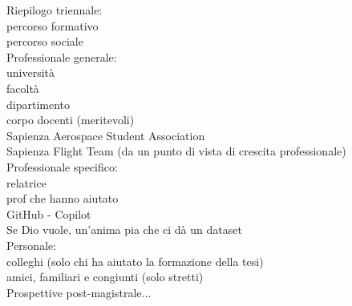 \begin{acknowledgments}
Riepilogo triennale:\\
\indent* percorso formativo\\
\indent* percorso sociale\\
Professionale generale:\\
\indent* università\\
\indent* facoltà\\
\indent* dipartimento\\
\indent* corpo docenti (meritevoli)\\
\indent* Sapienza Aerospace Student Association\\
\indent* Sapienza Flight Team (da un punto di vista di crescita professionale)\\
Professionale specifico:\\
\indent* relatrice\\
\indent* prof che hanno aiutato\\
\indent* GitHub - Copilot\\
\indent* Se Dio vuole, un'anima pia che ci dà un dataset\\
Personale:\\
\indent* colleghi (solo chi ha aiutato la formazione della tesi)\\
\indent* amici, familiari e congiunti (solo stretti)\\
Prospettive post-magistrale...
\end{acknowledgments}
